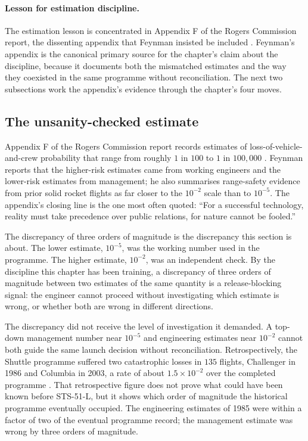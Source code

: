 \paragraph{Lesson for estimation discipline.}
The estimation lesson is concentrated in Appendix F of the Rogers
Commission report, the dissenting appendix that Feynman insisted be
included \cite{paper:ch09-feynman-appendix-f}. Feynman's appendix is
the canonical primary source for the chapter's claim about the
discipline, because it documents both the mismatched estimates and
the way they coexisted in the same programme without reconciliation.
The next two subsections work the appendix's evidence through the
chapter's four moves.

\subsection{The unsanity-checked estimate}

Appendix F of the Rogers Commission report records estimates of
loss-of-vehicle-and-crew probability that range from roughly $1$ in
$100$ to $1$ in $100{,}000$ \cite{paper:ch09-feynman-appendix-f}.
Feynman reports that the higher-risk estimates came from working
engineers and the lower-risk estimates from management; he also
summarises range-safety evidence from prior solid rocket flights as
far closer to the $10^{-2}$ scale than to $10^{-5}$. The appendix's
closing line is the one most often quoted: ``For a successful
technology, reality must take precedence over public relations, for
nature cannot be fooled.''

The discrepancy of three orders of magnitude is the discrepancy this
section is about. The lower estimate, $10^{-5}$, was the working
number used in the programme. The higher estimate, $10^{-2}$, was an
independent check. By the discipline this chapter has been training,
a discrepancy of three orders of magnitude between two estimates of
the same quantity is a release-blocking signal: the engineer cannot
proceed without investigating which estimate is wrong, or whether
both are wrong in different directions.

The discrepancy did not receive the level of investigation it
demanded. A top-down management number near $10^{-5}$ and engineering
estimates near $10^{-2}$ cannot both guide the same launch decision
without reconciliation. Retrospectively, the Shuttle programme
suffered two catastrophic losses in $135$ flights, Challenger in 1986
and Columbia in 2003, a rate of about $1.5 \times 10^{-2}$ over the
completed programme \cite{acc:nasa-challenger,acc:caib-columbia}.
That retrospective figure does not prove what could have been known
before STS-51-L, but it shows which order of magnitude the historical
programme eventually occupied. The engineering estimates of 1985 were
within a factor of two of the eventual programme record; the
management estimate was wrong by three orders of magnitude.

